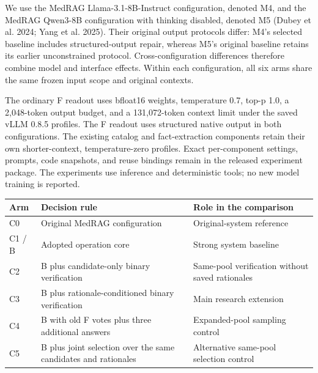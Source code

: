 \documentclass[
  english,
  11pt,
]{article}
\newcounter{none} %
\begin{document}
We use the MedRAG Llama-3.1-8B-Instruct configuration, denoted M4, and
the MedRAG Qwen3-8B configuration with thinking disabled, denoted M5
(Dubey et al. 2024; Yang et al. 2025). Their original output protocols
differ: M4's selected baseline includes structured-output repair,
whereas M5's original baseline retains its earlier unconstrained
protocol. Cross-configuration differences therefore combine model and
interface effects. Within each configuration, all six arms share the
same frozen input scope and original contexts.

The ordinary F readout uses bfloat16 weights, temperature 0.7, top-p
1.0, a 2,048-token output budget, and a 131,072-token context limit
under the saved vLLM 0.8.5 profiles. The F readout uses structured
native output in both configurations. The existing catalog and
fact-extraction components retain their own shorter-context,
temperature-zero profiles. Exact per-component settings, prompts, code
snapshots, and reuse bindings remain in the released experiment package.
The experiments use inference and deterministic tools; no new model
training is reported.

{\def\LTcaptype{none} %
\begin{longtable}[]{@{}
  >{\raggedright\arraybackslash}p{}
  >{\raggedright\arraybackslash}p{}
  >{\raggedright\arraybackslash}p{}@{}}
\toprule\noalign{}
\begin{minipage}[b]{\linewidth}\raggedright
Arm
\end{minipage} & \begin{minipage}[b]{\linewidth}\raggedright
Decision rule
\end{minipage} & \begin{minipage}[b]{\linewidth}\raggedright
Role in the comparison
\end{minipage} \\
\midrule\noalign{}
\endhead
\bottomrule\noalign{}
\endlastfoot
C0 & Original MedRAG configuration & Original-system reference \\
C1 / B & Adopted operation core & Strong system baseline \\
C2 & B plus candidate-only binary verification & Same-pool verification
without saved rationales \\
C3 & B plus rationale-conditioned binary verification & Main research
extension \\
C4 & B with old F votes plus three additional answers & Expanded-pool
sampling control \\
C5 & B plus joint selection over the same candidates and rationales &
Alternative same-pool selection control \\
\end{longtable}
}
\end{document}
